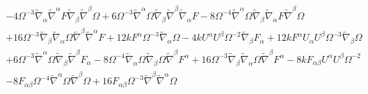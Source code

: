 \documentclass[10pt,letterpaper]{article}
\numberwithin{equation}{section}
\begin{document}
\begin{eqnarray}
&& - 4 \Omega^{-3} \tilde{\nabla}_{\alpha }\tilde{\nabla}^{\alpha }F \tilde{\nabla}_{\beta }\tilde{\nabla}^{\beta }\Omega + 6 \Omega^{-3} \tilde{\nabla}^{\alpha }\Omega \tilde{\nabla}_{\beta }\tilde{\nabla}^{\beta }\tilde{\nabla}_{\alpha }F - 8 \Omega^{-4} \tilde{\nabla}^{\alpha }\Omega \tilde{\nabla}_{\beta }\tilde{\nabla}_{\alpha }F \tilde{\nabla}^{\beta }\Omega \nonumber \\ 
&& + 16 \Omega^{-3} \tilde{\nabla}_{\beta }\tilde{\nabla}_{\alpha }\Omega \tilde{\nabla}^{\beta }\tilde{\nabla}^{\alpha }F+12 k F^{\alpha } \Omega^{-3} \tilde{\nabla}_{\alpha }\Omega - 4 k U^{\alpha } U^{\beta } \Omega^{-2} \tilde{\nabla}_{\beta }F_{\alpha } + 12 k F^{\alpha } U_{\alpha } U^{\beta } \Omega^{-3} \tilde{\nabla}_{\beta }\Omega \nonumber \\ 
&& + 6 \Omega^{-3} \tilde{\nabla}^{\alpha }\Omega \tilde{\nabla}_{\beta }\tilde{\nabla}^{\beta }F_{\alpha } - 8 \Omega^{-4} \tilde{\nabla}_{\alpha }\Omega \tilde{\nabla}_{\beta }\Omega \tilde{\nabla}^{\beta }F^{\alpha } + 16 \Omega^{-3} \tilde{\nabla}_{\beta }\tilde{\nabla}_{\alpha }\Omega \tilde{\nabla}^{\beta }F^{\alpha }-8 k F_{\alpha \beta } U^{\alpha } U^{\beta } \Omega^{-2} \nonumber \\ 
&& - 8 F_{\alpha \beta } \Omega^{-4} \tilde{\nabla}^{\alpha }\Omega \tilde{\nabla}^{\beta }\Omega + 16 F_{\alpha \beta } \Omega^{-3} \tilde{\nabla}^{\beta }\tilde{\nabla}^{\alpha }\Omega 
\end{eqnarray}

\end{document}
